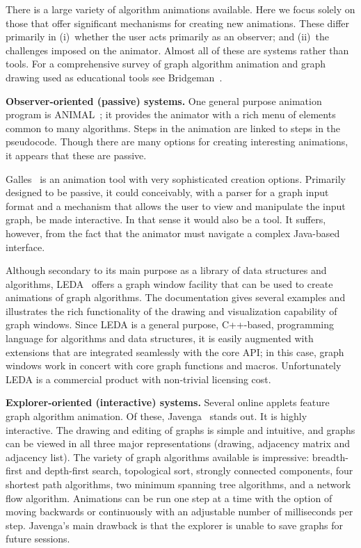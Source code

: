 There is a large variety of algorithm animations available. Here we focus solely on those that offer significant mechanisms for creating new animations.
These differ primarily in (i)~whether the user acts primarily as an observer; and
(ii)~the challenges imposed on the animator.
Almost all of these are systems rather than tools.
For a comprehensive survey of graph algorithm animation and graph drawing used
as educational tools see Bridgeman~\cite{2013-GDBook-Bridgeman}. 

\textbf{Observer-oriented (passive) systems.}
One general purpose animation program is ANIMAL~\cite{2002-JVLC-Roessling,ANIMAL};
it provides the animator
with a rich menu
of elements common to many algorithms.
Steps in the animation are linked to steps in the pseudocode.
Though there are many options for creating interesting animations,
it appears that these are passive.

Galles~\cite{Galles} is an animation tool with very
sophisticated creation options.
Primarily designed to be passive, it could conceivably, with a parser
for a graph input format and a mechanism that allows the user to view and
manipulate the input graph, be made interactive.
In that sense it would also be a tool.
It suffers, however, from the fact that the
animator must navigate a complex Java-based interface.

Although secondary to its main purpose as a library of data structures and
algorithms,
LEDA~\cite{1999-LEDA-Mehlhorn} offers a graph window facility that can be
used to create animations of graph algorithms.
The documentation gives several examples and illustrates the rich functionality of
the drawing and visualization capability of graph windows.
Since LEDA is a general purpose, C++-based, programming language for
algorithms and data structures, it is easily augmented with extensions that
are integrated seamlessly with the core API; in this case, graph windows work
in concert with core graph functions and macros.
Unfortunately LEDA is a commercial product with
non-trivial licensing cost.

\textbf{Explorer-oriented (interactive) systems.}
Several online applets feature graph algorithm animation. Of these,
Javenga~\cite{JAVENGA} stands out. It is highly interactive. The drawing and
editing of
graphs is simple and intuitive, and graphs can be viewed in all three major
representations (drawing, adjacency matrix and adjacency list).
The variety of graph algorithms available is impressive:
breadth-first and depth-first search, topological sort, strongly connected
components, four shortest path algorithms, two minimum spanning tree
algorithms, and a network flow algorithm.
Animations can be run one step at a time with the option of moving backwards
or continuously with an adjustable number of milliseconds per step.
Javenga's main drawback is that the explorer is unable to save graphs for
future sessions.

